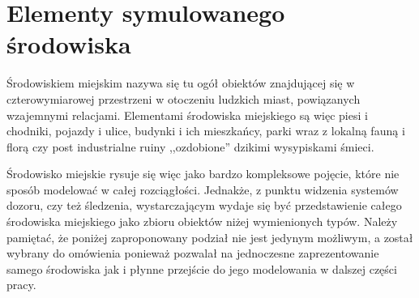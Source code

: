 \section[Elementy symulowanego środowiska][Elementy symulowanego środowiska]{Elementy symulowanego środowiska}
\par{
Środowiskiem miejskim nazywa się tu ogół obiektów znajdującej się w czterowymiarowej przestrzeni w otoczeniu ludzkich miast, powiązanych wzajemnymi relacjami. Elementami środowiska miejskiego są więc piesi i chodniki, pojazdy i ulice, budynki i ich mieszkańcy, parki wraz z lokalną fauną i florą czy post industrialne ruiny ,,ozdobione'' dzikimi wysypiskami śmieci.
}
\par{
Środowisko miejskie rysuje się więc jako bardzo kompleksowe pojęcie, które nie sposób modelować w całej rozciągłości. Jednakże, z punktu widzenia systemów dozoru, czy też śledzenia, wystarczającym wydaje się być przedstawienie całego środowiska miejskiego jako zbioru obiektów niżej wymienionych typów. Należy pamiętać, że poniżej zaproponowany podział nie jest jedynym możliwym, a został wybrany do omówienia ponieważ pozwalał na jednoczesne zaprezentowanie samego środowiska jak i płynne przejście do jego modelowania w dalszej części pracy.
}
